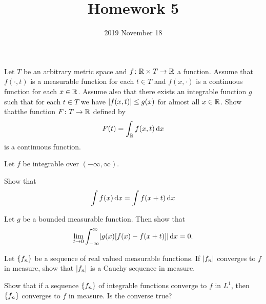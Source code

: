 \documentclass{../homework}
\title{Homework 5}
\author{}
\date{2019 November 18}
\begin{document}
\begin{problems}
\item Let \(T\) be an arbitrary metric space and
  \(f \colon \mathbb R \times T \to \mathbb R\) a function.  Assume that
  \(f(\cdot, t)\) is a measurable function for each \(t \in T\) and
  \(f(x, \cdot)\) is a continuous function for each \(x \in \mathbb R\).
  Assume also that there exists an integrable function \(g\) such that
  for each \(t \in T\) we have \(\lvert f(x, t)\rvert \le g(x)\) for almost
  all \(x \in \mathbb R\).  Show thatthe function \(F \colon T \to \mathbb R\)
  defined by
  \[
    F(t) = \int_\mathbb R f(x, t) \mathop{}\!\mathrm d x
  \]
  is a continuous function.

  \begin{solution}
  \end{solution}

\item Let \(f\) be integrable over \((-\infty, \infty)\).
  \begin{problems}
  \item Show that
    \[
      \int f(x) \mathop{}\!\mathrm d x = \int f(x+t) \mathop{}\!\mathrm d x
    \]

    \begin{solution}
    \end{solution}

  \item Let \(g\) be a bounded measurable function.  Then show that
    \[
      \lim_{t\to0} \int_{-\infty}^\infty
      \abs*{g(x) \sbr*{f(x)-f(x+t)}} \dif x = 0.
    \]

    \begin{solution}
    \end{solution}

  \end{problems}

\item
  \begin{problems}
  \item Let \(\{f_n\}\) be a sequence of real valued measurable
    functions.  If \(\lvert f_n\rvert\) converges to \(f\) in measure, show
    that \(\lvert f_n\rvert\) is a Cauchy sequence in measure.

    \begin{solution}
    \end{solution}

  \item Show that if a sequence \(\{f_n\}\) of integrable functions
    converge to \(f\) in \(L^1\), then \(\{f_n\}\) converges to
    \(f\) in measure.  Is the converse true?


\end{problems}
\end{problems}
\end{document}
